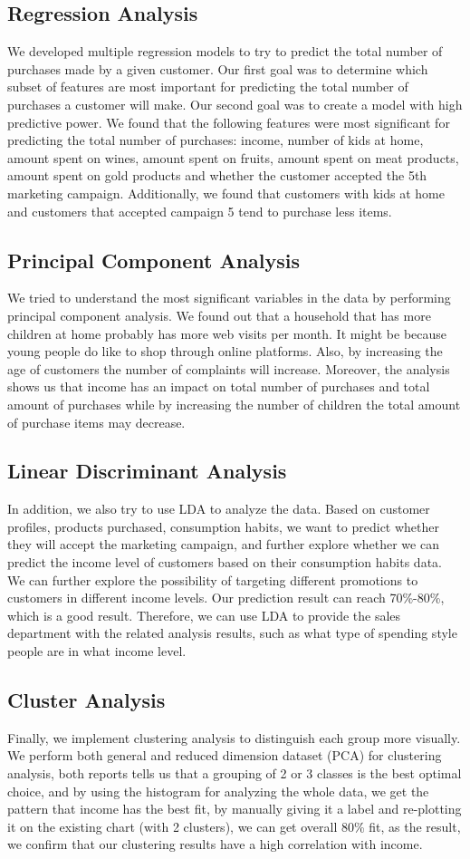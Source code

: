 \documentclass[11pt]{article} %
\begin{document}
\subsection{Regression Analysis}
We developed multiple regression models to try to predict the total number of purchases made by a given customer. Our first goal was to determine which subset of features are most important for predicting the total number of purchases a customer will make. Our second goal was to create a model with high predictive power. We found that the following features were most significant for predicting the total number of purchases: income, number of kids at home, amount spent on wines, amount spent on fruits, amount spent on meat products, amount spent on gold products  and whether the customer accepted the 5th marketing campaign. Additionally, we found that customers with kids at home and customers that accepted campaign 5 tend to purchase less items. 
\subsection{Principal Component Analysis}
We tried to understand the most significant variables in the data by performing principal component analysis. We found out that a household that has more children at home probably has more web visits per month. It might be because young people do like to shop through online platforms. Also, by increasing the age of customers the number of complaints will increase. Moreover, the analysis shows us that income has an impact on total number of purchases and total amount of purchases while by increasing the number of children the total amount of purchase items may decrease.
\subsection{Linear Discriminant Analysis}
In addition, we also try to use LDA to analyze the data. Based on customer profiles, products purchased, consumption habits, we want to predict whether they will accept the marketing campaign, and further explore whether we can predict the income level of customers based on their consumption habits data. We can further explore the possibility of targeting different promotions to customers in different income levels. Our prediction result can reach 70\%-80\%, which is a good result. Therefore, we can use LDA to provide the sales department with the related analysis results, such as what type of spending style people are in what income level.
\subsection{Cluster Analysis}
Finally, we implement clustering analysis to distinguish each group more visually. We perform both general and reduced dimension dataset (PCA) for clustering analysis, both reports tells us that a grouping of 2 or 3 classes is the best optimal choice, and by using the histogram for analyzing the whole data, we get the pattern that income has the best fit, by manually giving it a label and re-plotting it on the existing chart (with 2 clusters), we can get overall 80\% fit, as the result, we confirm that our clustering results have a high correlation with income.
\end{document}
